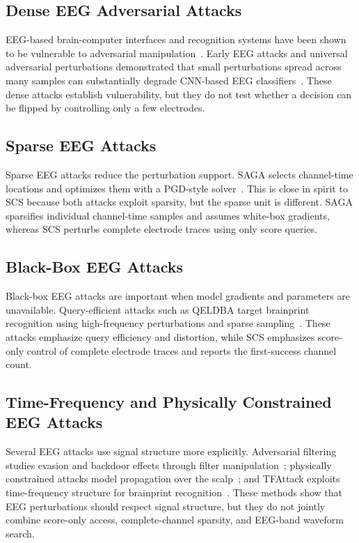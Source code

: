 \documentclass[journal]{IEEEtran}
\begin{document}
\subsection{Dense EEG Adversarial Attacks}

EEG-based brain-computer interfaces and recognition systems have been shown to be vulnerable to adversarial manipulation~\cite{zhang2021tiny,wu2023adversarial}. Early EEG attacks and universal adversarial perturbations demonstrated that small perturbations spread across many samples can substantially degrade CNN-based EEG classifiers~\cite{liu2021uap}. These dense attacks establish vulnerability, but they do not test whether a decision can be flipped by controlling only a few electrodes.

\subsection{Sparse EEG Attacks}

Sparse EEG attacks reduce the perturbation support. SAGA selects channel-time locations and optimizes them with a PGD-style solver~\cite{feng2021saga}. This is close in spirit to SCS because both attacks exploit sparsity, but the sparse unit is different. SAGA sparsifies individual channel-time samples and assumes white-box gradients, whereas SCS perturbs complete electrode traces using only score queries.

\subsection{Black-Box EEG Attacks}

Black-box EEG attacks are important when model gradients and parameters are unavailable. Query-efficient attacks such as QELDBA target brainprint recognition using high-frequency perturbations and sparse sampling~\cite{qian2025qeldba}. These attacks emphasize query efficiency and distortion, while SCS emphasizes score-only control of complete electrode traces and reports the first-success channel count.

\subsection{Time-Frequency and Physically Constrained EEG Attacks}

Several EEG attacks use signal structure more explicitly. Adversarial filtering studies evasion and backdoor effects through filter manipulation~\cite{meng2024adversarialfilter}; physically constrained attacks model propagation over the scalp~\cite{wang2022physical}; and TFAttack exploits time-frequency structure for brainprint recognition~\cite{yi2024tfattack}. These methods show that EEG perturbations should respect signal structure, but they do not jointly combine score-only access, complete-channel sparsity, and EEG-band waveform search.
\end{document}
